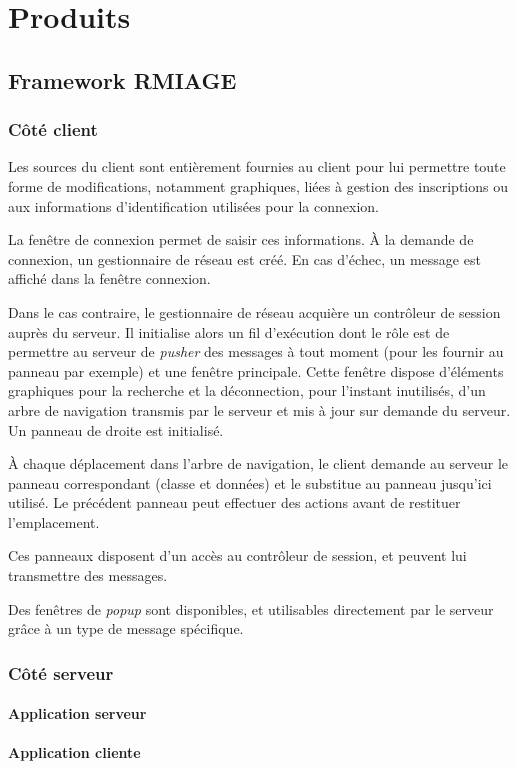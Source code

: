 \section{Produits}
\subsection{Framework RMIAGE}

\subsubsection{Côté client} %
\label{ssub:côté_client}

Les sources du client sont entièrement fournies au client pour lui permettre toute forme de modifications, notamment graphiques, liées à gestion des inscriptions ou aux informations d'identification utilisées pour la connexion.

La fenêtre de connexion permet de saisir ces informations. À la demande de connexion, un gestionnaire de réseau est créé. En cas d'échec, un message est affiché dans la fenêtre connexion.

Dans le cas contraire, le gestionnaire de réseau acquière un contrôleur de session auprès du serveur. Il initialise alors un fil d'exécution dont le rôle est de permettre au serveur de \emph{pusher} des messages à tout moment (pour les fournir au panneau par exemple) et une fenêtre principale. Cette fenêtre dispose d'éléments graphiques pour la recherche et la déconnection, pour l'instant inutilisés, d'un arbre de navigation transmis par le serveur et mis à jour sur demande du serveur. Un panneau de droite est initialisé.

À chaque déplacement dans l'arbre de navigation, le client demande au serveur le panneau correspondant (classe et données) et le substitue au panneau jusqu'ici utilisé. Le précédent panneau peut effectuer des actions avant de restituer l'emplacement.

Ces panneaux disposent d'un accès au contrôleur de session, et peuvent lui transmettre des messages.

Des fenêtres de \emph{popup} sont disponibles, et utilisables directement par le serveur grâce à un type de message spécifique.

\subsubsection{Côté serveur} %
\label{ssub:côté_serveur}



\paragraph{Application serveur}
\paragraph{Application cliente}
